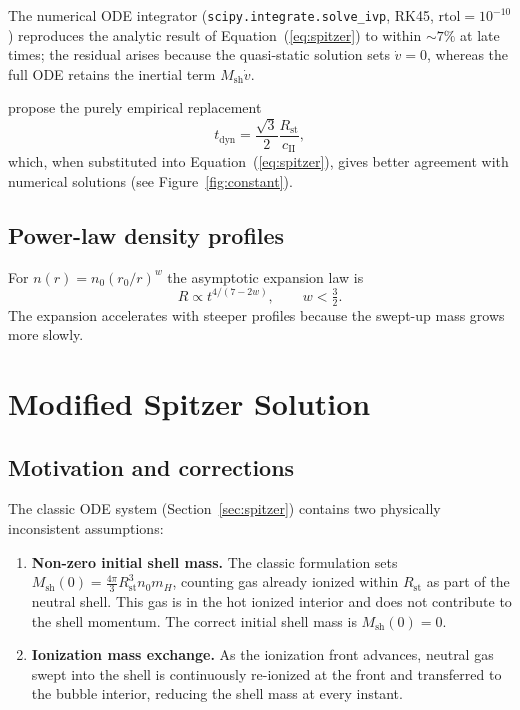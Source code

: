 \documentclass[12pt]{article}
\begin{document}
The numerical ODE integrator (\texttt{scipy.integrate.solve\_ivp}, RK45,
$\mathrm{rtol}=10^{-10}$) reproduces the analytic result of
Equation~(\ref{eq:spitzer}) to within $\sim7\%$ at late times; the
residual arises because the quasi-static solution sets $\dot{v}=0$,
whereas the full ODE retains the inertial term $M_\mathrm{sh}\dot{v}$.

\citet{HosokawaInutsuka2006} propose the purely empirical replacement
\begin{equation}
  \label{eq:tdyn_HI}
  t_\mathrm{dyn} = \frac{\sqrt{3}}{2}\frac{R_\mathrm{st}}{c_\mathrm{II}},
\end{equation}
which, when substituted into Equation~(\ref{eq:spitzer}), gives better
agreement with numerical solutions (see Figure~\ref{fig:constant}).

\subsection{Power-law density profiles}

For $n(r) = n_0 (r_0/r)^w$ the asymptotic expansion law is
\citep{FrancoEtal1990}
\begin{equation}
  R \propto t^{4/(7-2w)}, \qquad w < \tfrac{3}{2}.
\end{equation}
The expansion accelerates with steeper profiles because the swept-up mass
grows more slowly.

\section{Modified Spitzer Solution}
\label{sec:modified}

\subsection{Motivation and corrections}

The classic ODE system (Section~\ref{sec:spitzer}) contains two physically
inconsistent assumptions:
\begin{enumerate}
  \item \textbf{Non-zero initial shell mass.}  The classic formulation sets
    $M_\mathrm{sh}(0) = \frac{4\pi}{3}R_\mathrm{st}^3 n_0 m_H$, counting gas
    already ionized within $R_\mathrm{st}$ as part of the neutral shell.  This
    gas is in the hot ionized interior and does not contribute to the shell
    momentum.  The correct initial shell mass is $M_\mathrm{sh}(0)=0$.
  \item \textbf{Ionization mass exchange.}  As the ionization front advances,
    neutral gas swept into the shell is continuously re-ionized at the front and
    transferred to the bubble interior, reducing the shell mass at every
    instant.
\end{enumerate}
\end{document}
